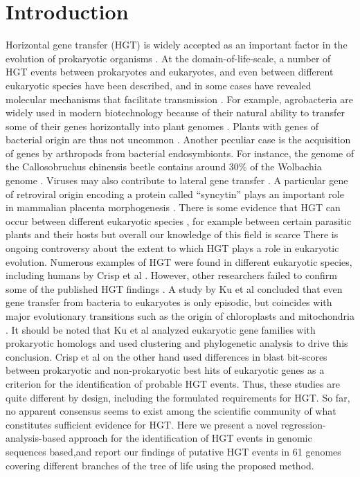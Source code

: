 \section{Introduction}
\label{intro}
Horizontal gene transfer (HGT) is widely accepted as an important factor in the
evolution of prokaryotic organisms \cite{Ochman2000}. At the
domain-of-life-scale, a number of HGT events between prokaryotes and
eukaryotes, and even between different eukaryotic species have been described,
and in some cases have revealed molecular mechanisms that facilitate
transmission \cite{Soucy2015}. For example, agrobacteria are widely used in
modern biotechnology because of their natural ability to transfer some of their
genes horizontally into plant genomes \cite{Chilton1977}. Plants with genes of
bacterial origin are thus not uncommon \cite{Kyndt2015, Matveeva2012,
Matveeva2014}. Another peculiar case is the acquisition of genes by arthropods
from bacterial endosymbionts. For instance, the genome of the Callosobruchus
chinensis beetle contains around 30\% of the Wolbachia genome \cite{Nikoh2008}.
Viruses may also contribute to lateral gene transfer \cite{Drezen2017}. A
particular gene of retroviral origin encoding a protein called “syncytin” plays
an important role in mammalian placenta morphogenesis \cite{Mi2000}. There is
some evidence that HGT can occur between different eukaryotic species
\cite{Soucy2015}, for example between certain parasitic plants and their hosts
\cite{Yoshida2010,Xi2012,Zhang2013,Zhang2014} but overall our knowledge of
this field is scarce There is ongoing controversy about the extent to which HGT
plays a role in eukaryotic evolution. Numerous examples of HGT were found in
different eukaryotic species, including humans by Crisp et al \cite{Crisp2015}.
However, other researchers failed to confirm some of the published HGT findings
\cite{Salzberg2017}. A study by Ku et al concluded that even gene transfer from
bacteria to eukaryotes is only episodic, but coincides with major evolutionary
transitions such as the origin of chloroplasts and mitochondria \cite{Ku2015}.
It should be noted that Ku et al analyzed eukaryotic gene families with
prokaryotic homologs and used clustering and phylogenetic analysis to drive
this conclusion. Crisp et al on the other hand used differences in blast
bit-scores between prokaryotic and non-prokaryotic best hits of eukaryotic
genes as a criterion for the identification of probable HGT events. Thus, these
studies are quite different by design, including the formulated requirements
for HGT. So far, no apparent consensus seems to exist among the scientific
community of what constitutes sufficient evidence for HGT. Here we present a
novel regression-analysis-based approach for the identification of HGT events
in genomic sequences based,and report our findings of putative HGT events in 61
genomes covering different branches of the tree of life using the proposed
method.
